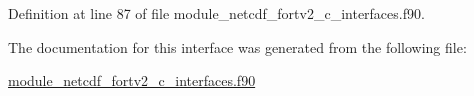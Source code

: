 Definition at line 87 of file module\+\_\+netcdf\+\_\+fortv2\+\_\+c\+\_\+interfaces.\+f90.



The documentation for this interface was generated from the following file\+:\begin{DoxyCompactItemize}
\item 
\hyperlink{module__netcdf__fortv2__c__interfaces_8f90}{module\+\_\+netcdf\+\_\+fortv2\+\_\+c\+\_\+interfaces.\+f90}\end{DoxyCompactItemize}
